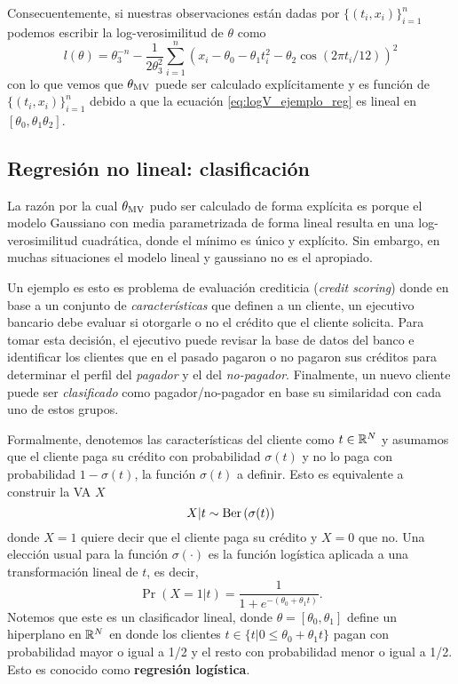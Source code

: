 Consecuentemente, si nuestras observaciones están dadas por $\{(t_i,x_i)\}_{i=1}^n$ podemos escribir la log-verosimilitud de $\theta$ como 
\begin{equation}
	\label{eq:logV_ejemplo_reg}
	l(\theta) = \theta_3^{-n} - \frac{1}{2\theta_3^2}\sum_{i=1}^n (x_i - \theta_0 - \theta_1 t_i^2 - \theta_2\cos(2\pi t_i/12))^2
\end{equation}
con lo que vemos que ${\theta_\text{MV}}$ puede ser calculado explícitamente y es función de $\{(t_i,x_i)\}_{i=1}^n$ debido a que la ecuación \ref{eq:logV_ejemplo_reg} es lineal en $[\theta_0,\theta_1\theta_2]$.



\subsection{Regresión no lineal: clasificación} 
\label{sub:clasif}

La razón por la cual ${\theta_\text{MV}}$ pudo ser calculado de forma explícita es porque el modelo Gaussiano con media parametrizada de forma lineal resulta en una log-verosimilitud cuadrática, donde el mínimo es único y explícito. Sin embargo, en muchas situaciones el modelo lineal y gaussiano no es el apropiado. 

Un ejemplo es esto es problema de evaluación crediticia (\textit{credit scoring}) donde en base a un conjunto de \textit{características} que definen a un cliente, un ejecutivo bancario debe evaluar si otorgarle o no el crédito que el cliente solicita. Para tomar esta decisión, el ejecutivo puede revisar la base de datos del banco e identificar los clientes que en el pasado pagaron o no pagaron sus créditos para determinar el perfil del \textit{pagador} y el del \textit{no-pagador}. Finalmente, un nuevo cliente puede ser \textit{clasificado} como pagador/no-pagador en base su similaridad con cada uno de estos grupos. 

Formalmente, denotemos las características del cliente como $t\in{\mathbb R}^N$ y asumamos que el cliente paga su crédito con probabilidad $\sigma(t)$ y no lo paga con probabilidad $1- \sigma(t)$, la función $\sigma(t)$ a definir. Esto es equivalente a construir la VA $X$
\begin{equation}
 	X|t \sim \text{Ber}\left(\sigma(t)\right)
 \end{equation} 
 donde $X=1$ quiere decir que el cliente paga su crédito y $X=0$ que no. Una elección usual para la función $\sigma(\cdot)$ es la función logística aplicada a una transformación lineal de $t$, es decir, 
 \begin{equation}
 	\Pr{(X=1|t)} = \frac{1}{1+e^{-(\theta_0 + \theta_1 t)	}}.
 \end{equation}
Notemos que este es un clasificador lineal, donde $\theta = [\theta_0, \theta_1]$ define un hiperplano en ${\mathbb R}^N$ en donde los clientes $t\in\{t | 0\leq \theta_0 + \theta_1 t\}$ pagan con probabilidad mayor o igual a 1/2 y el resto con probabilidad menor o igual a 1/2. Esto es conocido como \textbf{regresión logística}. 

